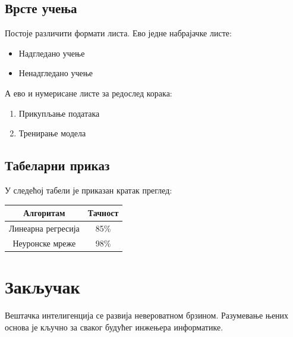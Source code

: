 \documentclass[12pt,a4paper]{article}
\begin{document}
\subsection{Врсте учења}
Постоје различити формати листа. Ево једне набрајачке листе:
\begin{itemize}
    \item Надгледано учење
    \item Ненадгледано учење
\end{itemize}

А ево и нумерисане листе за редослед корака:
\begin{enumerate}
    \item Прикупљање података
    \item Тренирање модела
\end{enumerate}

\subsection{Табеларни приказ}
У следећој табели је приказан кратак преглед:

\begin{center}
\begin{tabular}{|c|c|}
\hline
\textbf{Алгоритам} & \textbf{Тачност} \\ \hline
Линеарна регресија & 85\% \\ \hline
Неуронске мреже & 98\% \\ \hline
\end{tabular}
\end{center}

\section{Закључак}
Вештачка интелигенција се развија невероватном брзином. Разумевање њених основа је кључно за сваког будућег инжењера информатике.
\end{document}
